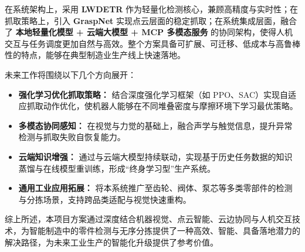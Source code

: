 \documentclass{cumcmthesis}
\begin{document}
在系统架构上，采用 \textbf{LWDETR} 作为轻量化检测核心，兼顾高精度与实时性；在抓取策略上，引入 \textbf{GraspNet} 实现点云层面的稳定抓取；在系统集成层面，融合了 \textbf{本地轻量化模型 + 云端大模型 + MCP 多模态服务} 的协同架构，使得人机交互与任务调度更加自然与高效。整个方案具备可扩展、可迁移、低成本与高鲁棒性的特点，能够在典型制造业生产线上快速落地。

未来工作将围绕以下几个方向展开：

\begin{itemize}
    \item \textbf{强化学习优化抓取策略：} 结合深度强化学习框架（如 PPO、SAC）实现自适应抓取动作优化，使机器人能够在不同堆叠密度与摩擦环境下学习最优策略。
    \item \textbf{多模态协同感知：} 在视觉与力觉的基础上，融合声学与触觉信息，提升异常检测与抓取失败自恢复能力。
    \item \textbf{云端知识增强：} 通过与云端大模型持续联动，实现基于历史任务数据的知识蒸馏与在线模型重训练，形成“终身学习型”生产系统。
    \item \textbf{通用工业应用拓展：} 将本系统推广至齿轮、阀体、泵芯等多类零部件的检测与分拣场景，支持跨品类适配与视觉快速重构。
\end{itemize}

综上所述，本项目方案通过深度结合机器视觉、点云智能、云边协同与人机交互技术，为智能制造中的零件检测与无序分拣提供了一种高效、智能、具备落地潜力的解决路径，为未来工业生产的智能化升级提供了参考价值。
\end{document}
